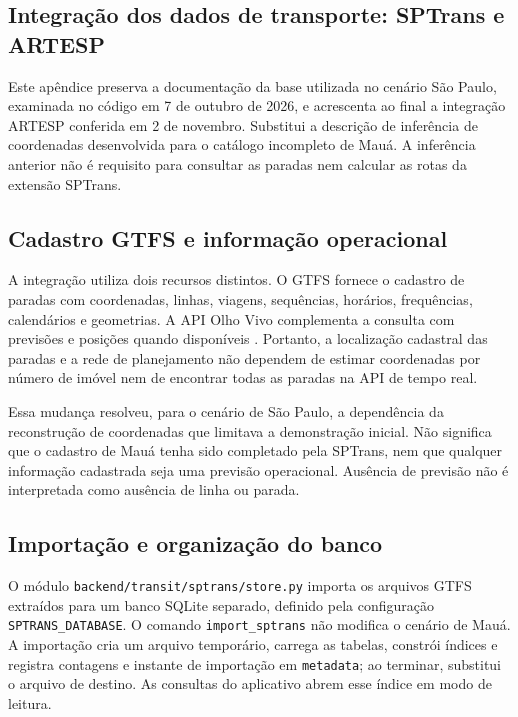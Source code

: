 \documentclass[12pt,oneside,a4paper,brazil,chapter=TITLE]{abntex2}
\let\papsection\section
\renewcommand{\section}{\clearpage\papsection}
\begin{document}
\begin{apendicesenv}



\chapter{Integração dos dados de transporte: SPTrans e ARTESP}
\label{ap:importacao}
Este apêndice preserva a documentação da base utilizada no cenário São Paulo, examinada no código em 7 de outubro de 2026, e acrescenta ao final a integração ARTESP conferida em 2 de novembro. Substitui a descrição de inferência de coordenadas desenvolvida para o catálogo incompleto de Mauá. A inferência anterior não é requisito para consultar as paradas nem calcular as rotas da extensão SPTrans.

\section{Cadastro GTFS e informação operacional}
A integração utiliza dois recursos distintos. O GTFS fornece o cadastro de paradas com coordenadas, linhas, viagens, sequências, horários, frequências, calendários e geometrias. A API Olho Vivo complementa a consulta com previsões e posições quando disponíveis \citep{gtfs,sptransapi}. Portanto, a localização cadastral das paradas e a rede de planejamento não dependem de estimar coordenadas por número de imóvel nem de encontrar todas as paradas na API de tempo real.

Essa mudança resolveu, para o cenário de São Paulo, a dependência da reconstrução de coordenadas que limitava a demonstração inicial. Não significa que o cadastro de Mauá tenha sido completado pela SPTrans, nem que qualquer informação cadastrada seja uma previsão operacional. Ausência de previsão não é interpretada como ausência de linha ou parada.

\section{Importação e organização do banco}
O módulo \nolinkurl{backend/transit/sptrans/store.py} importa os arquivos GTFS extraídos para um banco SQLite separado, definido pela configuração \texttt{SPTRANS\_DATABASE}. O comando \texttt{import\_sptrans} não modifica o cenário de Mauá. A importação cria um arquivo temporário, carrega as tabelas, constrói índices e registra contagens e instante de importação em \texttt{metadata}; ao terminar, substitui o arquivo de destino. As consultas do aplicativo abrem esse índice em modo de leitura.


\end{apendicesenv}
\end{document}
